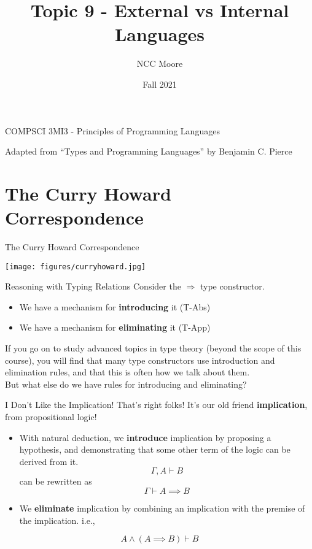 \documentclass[11pt]{beamer}
\author{NCC Moore}
\title{Topic 9 - External vs Internal Languages}
\institute{McMaster University}
\date{Fall 2021}
\begin{document}
\begin{frame}
\center
COMPSCI 3MI3 - Principles of Programming Languages
\titlepage

Adapted from ``Types and Programming Languages'' by Benjamin C. Pierce 
\end{frame}

\begin{frame}
\tableofcontents
\end{frame}

\section[C-H]{The Curry Howard Correspondence}
\begin{frame}[fragile=singleslide]{The Curry Howard Correspondence}
\begin{center}
\texttt{[image: figures/curryhoward.jpg]}
\end{center}
\end{frame}

\begin{frame}[fragile=singleslide]{Reasoning with Typing Relations}
Consider the $\Rightarrow$ type constructor. 
\begin{itemize}
\item We have a mechanism for \textbf{introducing} it (T-Abs)
\item We have a mechanism for \textbf{eliminating} it (T-App)
\end{itemize}
If you go on to study advanced topics in type theory (beyond the scope of this course), you will find that many type constructors use introduction and elimination rules, and that this is often how we talk about them.  \\
\vspace{1em}
But what else do we have rules for introducing and eliminating? 
\end{frame}

\begin{frame}[fragile=singleslide]{I Don't Like the Implication!}
That's right folks! It's our old friend \textbf{implication}, from propositional logic! 
\begin{itemize}
\item With natural deduction, we \textbf{introduce} implication by proposing a hypothesis, and demonstrating that some other term of the logic can be derived from it.  
\begin{equation}
\Gamma, A \vdash B
\end{equation}
can be rewritten as 
\begin{equation}
\Gamma \vdash A \implies B
\end{equation}
\item We \textbf{eliminate} implication by combining an implication with the premise of the implication.  i.e., 
\end{itemize}
\begin{equation}
A \land (A \implies B) \vdash B
\end{equation}
\end{frame}
\end{document}
